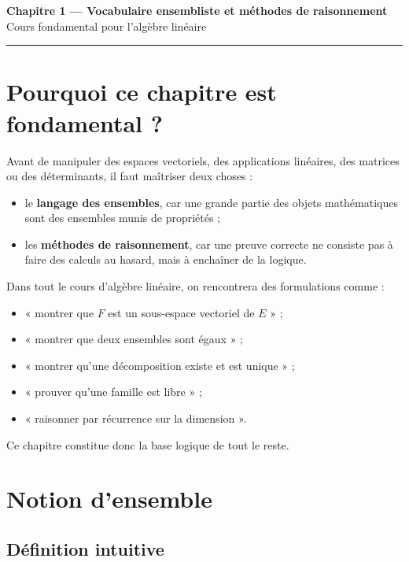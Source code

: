 \documentclass[11pt,a4paper]{article}
\theoremstyle{remark}
\begin{document}
\begin{center}
    {\LARGE \textbf{Chapitre 1 --- Vocabulaire ensembliste et méthodes de raisonnement}}\\[0.5em]
    {\large Cours fondamental pour l’algèbre linéaire}
\end{center}

\hrule
\vspace{1em}

\tableofcontents

\newpage

\section{Pourquoi ce chapitre est fondamental ?}

Avant de manipuler des espaces vectoriels, des applications linéaires, des matrices ou des déterminants, il faut maîtriser deux choses :
\begin{itemize}
    \item le \textbf{langage des ensembles}, car une grande partie des objets mathématiques sont des ensembles munis de propriétés ;
    \item les \textbf{méthodes de raisonnement}, car une preuve correcte ne consiste pas à faire des calculs au hasard, mais à enchaîner de la logique.
\end{itemize}

Dans tout le cours d’algèbre linéaire, on rencontrera des formulations comme :
\begin{itemize}
    \item « montrer que \(F\) est un sous-espace vectoriel de \(E\) » ;
    \item « montrer que deux ensembles sont égaux » ;
    \item « montrer qu’une décomposition existe et est unique » ;
    \item « prouver qu’une famille est libre » ;
    \item « raisonner par récurrence sur la dimension ».
\end{itemize}

Ce chapitre constitue donc la base logique de tout le reste.

\section{Notion d’ensemble}

\subsection{Définition intuitive}
\end{document}

